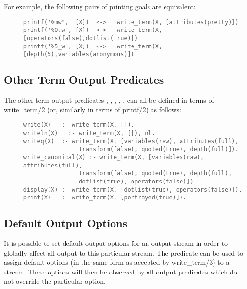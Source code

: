 For example, the following pairs of printing goals are equivalent:
\begin{quote}\begin{verbatim}
printf("%mw",  [X])  <->   write_term(X, [attributes(pretty)])
printf("%O.w", [X])  <->   write_term(X, [operators(false),dotlist(true)])
printf("%5_w", [X])  <->   write_term(X, [depth(5),variables(anonymous)])
\end{verbatim}\end{quote}


\subsection{Other Term Output Predicates}

The other term output predicates
,
,
,
,
,
can all be defined in terms of write_term/2 (or, similarly
in terms of printf/2) as follows:
\begin{quote}\begin{verbatim}
write(X)   :- write_term(X, []).
writeln(X)   :- write_term(X, []), nl.
writeq(X)  :- write_term(X, [variables(raw), attributes(full),
                transform(false), quoted(true), depth(full)]).
write_canonical(X) :- write_term(X, [variables(raw), attributes(full),
                transform(false), quoted(true), depth(full),
                dotlist(true), operators(false)]).
display(X) :- write_term(X, [dotlist(true), operators(false)]).
print(X)   :- write_term(X, [portrayed(true)]).
\end{verbatim}\end{quote}


\subsection{Default Output Options}

It is possible to set default output options for an output stream
in order to globally affect all output to this particular stream.
The
predicate can be used to assign default options (in the same form as
accepted by write_term/3) to a stream.
These options will then be observed by all output predicates which do not
override the particular option.



